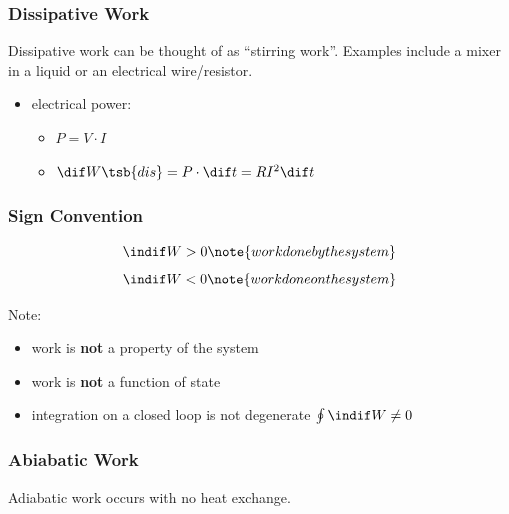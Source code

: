 \documentclass{article}
\begin{document}
\subsubsection{Dissipative Work}

Dissipative work can be thought of as ``stirring work''. Examples include a mixer in a liquid or an electrical wire/resistor.

\begin{itemize}
        \item electrical power:
        \begin{itemize}
                \item $P = V \cdot I$
                \item $\dif W\tsb{dis} = P \cdot \dif t = R I^2 \dif t$
        \end{itemize}
\end{itemize}

\subsubsection{Sign Convention}

\[ \indif W > 0 \note{work done by the system} \]
\[ \indif W < 0 \note{work done on the system} \]

Note:

\begin{itemize}
        \item work is \textbf{not} a property of the system
        \item work is \textbf{not} a function of state
        \item integration on a closed loop is not degenerate $\oint \indif W \neq 0$
\end{itemize}

\subsubsection{Abiabatic Work}

Adiabatic work occurs with no heat exchange.

\begin{center}
\end{center}
\end{document}
